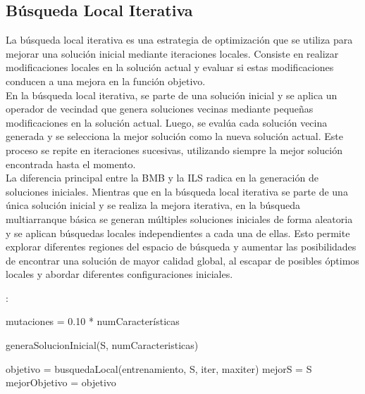 \subsection{Búsqueda Local Iterativa}
La búsqueda local iterativa es una estrategia de optimización que se utiliza para mejorar una solución inicial mediante iteraciones locales. Consiste en realizar modificaciones locales en la solución actual y evaluar si estas modificaciones conducen a una mejora en la función objetivo.\\

En la búsqueda local iterativa, se parte de una solución inicial y se aplica un operador de vecindad que genera soluciones vecinas mediante pequeñas modificaciones en la solución actual. Luego, se evalúa cada solución vecina generada y se selecciona la mejor solución como la nueva solución actual. Este proceso se repite en iteraciones sucesivas, utilizando siempre la mejor solución encontrada hasta el momento.\\

La diferencia principal entre la BMB y la ILS radica en la generación de soluciones iniciales. Mientras que en la búsqueda local iterativa se parte de una única solución inicial y se realiza la mejora iterativa, en la búsqueda multiarranque básica se generan múltiples soluciones iniciales de forma aleatoria y se aplican búsquedas locales independientes a cada una de ellas. Esto permite explorar diferentes regiones del espacio de búsqueda y aumentar las posibilidades de encontrar una solución de mayor calidad global, al escapar de posibles óptimos locales y abordar diferentes configuraciones iniciales.\\

\begin{algorithm}[H]
	
	
	\BlankLine
	:
	\BlankLine	
	
	mutaciones = 0.10 * numCaracterísticas\\
	
	generaSolucionInicial(S, numCaracteristicas)
	
	objetivo = busquedaLocal(entrenamiento, S, iter, maxiter)
	\BlankLine
	mejorS = S\\
	mejorObjetivo = objetivo\\
	
	\;
\end{algorithm}


